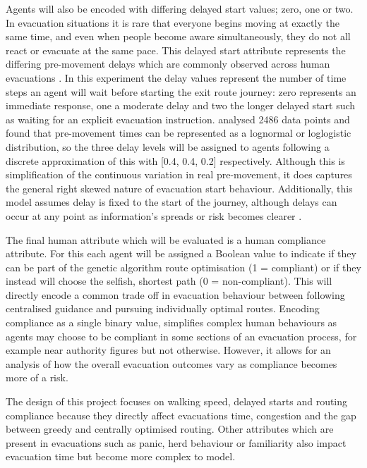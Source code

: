 \documentclass[12pt,a4paper]{report}
\begin{document}
Agents will also be encoded with differing delayed start values; zero, one or two. In evacuation situations it is rare that everyone begins moving at exactly the same time, and even when people become aware simultaneously, they do not all react or evacuate at the same pace. This delayed start attribute represents the differing pre-movement delays which are commonly observed across human evacuations \citep{FAHY_2001_DELAYED_STARTS}. In this experiment the delay values represent the number of time steps an agent will wait before starting the exit route journey: zero represents an immediate response, one a moderate delay and two the longer delayed start such as waiting for an explicit evacuation instruction. \cite{FORSSBERG_2019_DELAYED_STARTS} analysed 2486 data points and found that pre-movement times can be represented as a lognormal or loglogistic distribution, so the three delay levels will be assigned to agents following a discrete approximation of this with [0.4, 0.4, 0.2] respectively. Although this is simplification of the continuous variation in real pre-movement, it does captures the general right skewed nature of evacuation start behaviour. Additionally, this model assumes delay is fixed to the start of the journey, although delays can occur at any point as information’s spreads or risk becomes clearer \citep{BODE_2018_DELAYED_STARTS}. 

The final human attribute which will be evaluated is a human compliance attribute. For this each agent will be assigned a Boolean value to indicate if they can be part of the genetic algorithm route optimisation (1 = compliant) or if they instead will choose the selfish, shortest path (0 = non-compliant). This will directly encode a common trade off in evacuation behaviour between following centralised guidance and pursuing individually optimal routes. Encoding compliance as a single binary value, simplifies complex human behaviours as agents may choose to be compliant in some sections of an evacuation process, for example near authority figures but not otherwise. However, it allows for an analysis of how the overall evacuation outcomes vary as compliance becomes more of a risk.

The design of this project focuses on walking speed, delayed starts and routing compliance because they directly affect evacuations time, congestion and the gap between greedy and centrally optimised routing. Other attributes which are present in evacuations such as panic, herd behaviour or familiarity also impact evacuation time but become more complex to model. 
\end{document}
